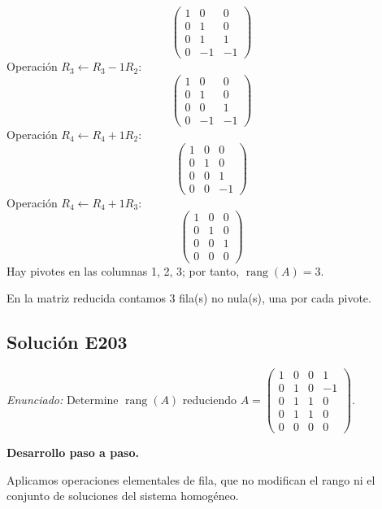 \documentclass[12pt]{article}
\theoremstyle{remark}
\newcommand{\rang}{\operatorname{rang}}
\newcommand{\solucion}[2]{\Needspace{11\baselineskip}\subsection*{Solución E#1}\noindent\textit{Enunciado:} #2\par\medskip\noindent\textbf{Desarrollo paso a paso.}\par\medskip}
\begin{document}
\[
\begin{pmatrix}1&0&0\\0&1&0\\0&1&1\\0&-1&-1\end{pmatrix}
\]
Operación $R_{3}\leftarrow R_{3}-1R_{2}$:
\[
\begin{pmatrix}1&0&0\\0&1&0\\0&0&1\\0&-1&-1\end{pmatrix}
\]
Operación $R_{4}\leftarrow R_{4}+1R_{2}$:
\[
\begin{pmatrix}1&0&0\\0&1&0\\0&0&1\\0&0&-1\end{pmatrix}
\]
Operación $R_{4}\leftarrow R_{4}+1R_{3}$:
\[
\begin{pmatrix}1&0&0\\0&1&0\\0&0&1\\0&0&0\end{pmatrix}
\]
Hay pivotes en las columnas 1, 2, 3; por tanto, $\boxed{\rang(A)=3}$.

En la matriz reducida contamos 3 fila(s) no nula(s), una por cada pivote.


\medskip

\solucion{203}{Determine $\rang(A)$ reduciendo $A=\begin{pmatrix}1&0&0&1\\0&1&0&-1\\0&1&1&0\\0&1&1&0\\0&0&0&0\end{pmatrix}$.}
Aplicamos operaciones elementales de fila, que no modifican el rango ni el conjunto de soluciones del sistema homogéneo.
\end{document}
